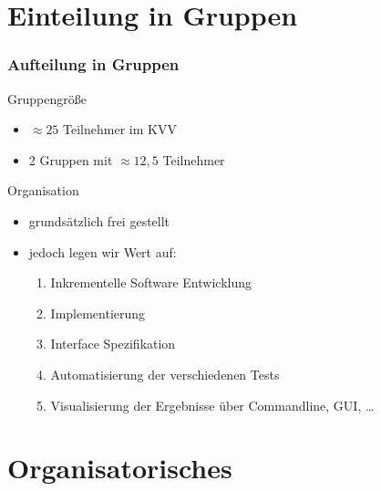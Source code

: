 \documentclass[ucs,9pt]{beamer}
\begin{document}
\section{Einteilung in Gruppen}
\begin{frame}
    \frametitle{Aufteilung in Gruppen}
    \begin{block}{Gruppengröße}
        \begin{itemize}
            \item $\approx 25$ Teilnehmer im KVV
            \item 2 Gruppen mit $\approx 12,5$ Teilnehmer
        \end{itemize}
    \end{block}
    \begin{block}{Organisation}
        \begin{itemize}
            \item grundsätzlich frei gestellt
            \item jedoch legen wir Wert auf:
                \begin{enumerate}
                    \item Inkrementelle Software Entwicklung
                    \item Implementierung
                    \item Interface Spezifikation
                    \item Automatisierung der verschiedenen Tests
                    \item Visualisierung der Ergebnisse über Commandline, GUI,
                        \dots
                \end{enumerate}
        \end{itemize}
    \end{block}
\end{frame}

\section{Organisatorisches}
\end{document}
